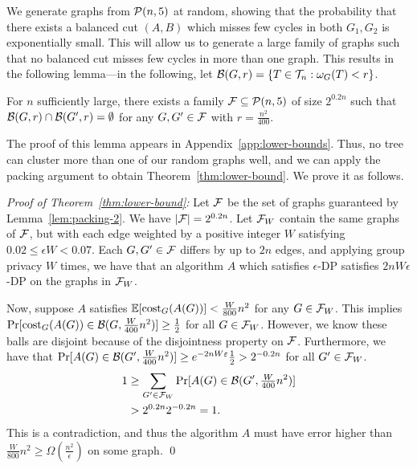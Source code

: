 We generate graphs from $\mathcal{P}(n, 5)$ at random, showing that the probability that there exists a balanced cut $(A,B)$ which misses few cycles in both $G_1, G_2$ is exponentially small. This will allow us to generate a large family of graphs such that no balanced cut misses few cycles in more than one graph. This results in the following lemma---in the following, let $\mathcal{B}(G, r) = \{T \in \mathcal{T}_n : \omega_G(T) < r\}$.
\begin{lem}\label{lem:packing-2}
    For $n$ sufficiently large, there exists a family $\mathcal{F} \subseteq \mathcal{P}(n,5)$ of size $2^{0.2n}$ such that $\mathcal{B}(G, r) \cap \mathcal{B}(G', r) = \emptyset$ for any $G,G' \in \mathcal{F}$ with $r = \frac{n^2}{400}$.
\end{lem}

The proof of this lemma appears in Appendix~\ref{app:lower-bounds}.
Thus, no tree can cluster more than one of our random graphs well, and we can apply the packing argument to obtain Theorem~\ref{thm:lower-bound}.
We prove it as follows.

\noindent \textit{Proof of Theorem~\ref{thm:lower-bound}:} 
Let $\mathcal{F}$ be the set of graphs guaranteed by Lemma~\ref{lem:packing-2}. We have $|\mathcal{F}| = 2^{0.2n}$. Let $\mathcal{F}_W$ contain the same graphs of $\mathcal{F}$, but with each edge weighted by a positive integer $W$ satisfying $0.02 \leq \epsilon W < 0.07$. Each $G,G' \in \mathcal{F}$ differs by up to $2n$ edges, and applying group privacy $W$ times, we have that an algorithm $A$ which satisfies $\epsilon$-DP satisfies $2n W \epsilon$-DP on the graphs in $\mathcal{F}_W$.

Now, suppose $A$ satisfies $\operatorname{\mathbb{E}}[\textnormal{cost}_G(A(G))] < \frac{W}{800} n^2$ for any $G \in \mathcal{F}_W$. This implies $\Pr[\textnormal{cost}_G(A(G)) \in \mathcal{B}(G, \frac{W}{400} n^2)] \geq \frac{1}{2}$ for all $G \in \mathcal{F}_W$. However, we know these balls are disjoint because of the disjointness property on $\mathcal{F}$. Furthermore, we have that $\Pr[A(G) \in \mathcal{B}(G', \frac{W}{400} n^2)] \geq e^{-2nW\varepsilon} \frac{1}{2} > 2^{-0.2n}$ for all $G' \in \mathcal{F}_W$.
\begin{align*}
    1 &\geq \sum_{G' \in \mathcal{F}_W} \Pr[A(G) \in \mathcal{B}(G', \tfrac{W}{400} n^2)] \\
    &> 2^{0.2 n} 2^{-0.2n} = 1.
\end{align*}
This is a contradiction, and thus the algorithm $A$ must have error higher than $\frac{W}{800}n^2 \geq \Omega(\frac{n^2}{\epsilon})$ on some graph. \qed